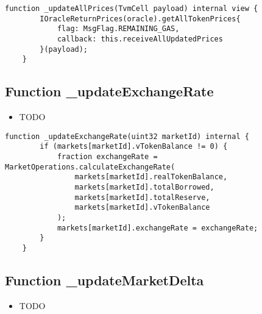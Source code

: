 \begin{lstlisting}[firstnumber=447]
    function _updateAllPrices(TvmCell payload) internal view {
        IOracleReturnPrices(oracle).getAllTokenPrices{
            flag: MsgFlag.REMAINING_GAS,
            callback: this.receiveAllUpdatedPrices
        }(payload);
    }
\end{lstlisting}

\subsection{Function \_{}updateExchangeRate}

\noindent\begin{itemize}
\item TODO
\end{itemize}

\begin{lstlisting}[firstnumber=190]
    function _updateExchangeRate(uint32 marketId) internal {
        if (markets[marketId].vTokenBalance != 0) {
            fraction exchangeRate = MarketOperations.calculateExchangeRate(
                markets[marketId].realTokenBalance,
                markets[marketId].totalBorrowed,
                markets[marketId].totalReserve,
                markets[marketId].vTokenBalance
            );
            markets[marketId].exchangeRate = exchangeRate;
        }
    }
\end{lstlisting}

\subsection{Function \_{}updateMarketDelta}

\noindent\begin{itemize}
\item TODO
\end{itemize}

